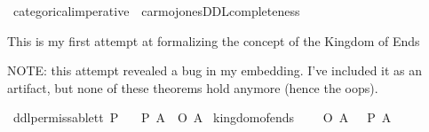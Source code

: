 %
\begin{isabellebody}%
%
%
\isadelimtheory
%
\endisadelimtheory
%
\isatagtheory
{}\isamarkupfalse%
\ categorical{\isacharunderscore}imperative{\isacharunderscore}{}\ \ carmojones{\isacharunderscore}DDL{\isacharunderscore}completeness\isanewline
\isanewline
{}%
\endisatagtheory
{\isafoldtheory}%
%
\isadelimtheory
%
\endisadelimtheory
%
\isadelimdocument
%
\endisadelimdocument
%
\isatagdocument
%
\isamarkuptrue%
%
\isamarkuptrue%
%
\endisatagdocument
{\isafolddocument}%
%
\isadelimdocument
%
\endisadelimdocument
%
\begin{isamarkuptext}%
This is my first attempt at formalizing the concept of the Kingdom of Ends%
\end{isamarkuptext}\isamarkuptrue%
%
\begin{isamarkuptext}%
NOTE: this attempt revealed a bug in my embedding. I've included it as an artifact, but none of these theorems hold anymore (hence the oops).%
\end{isamarkuptext}\isamarkuptrue%
\isamarkupfalse%
\ ddlpermissable{\isacharcolon}{\isacharcolon}{\isachardoublequoteopen}t{\isasymRightarrow}t{\isachardoublequoteclose}\ {\isacharparenleft}{\isachardoublequoteopen}P{\isacharunderscore}{\isachardoublequoteclose}{\isacharparenright}\isanewline
\ \ \ {\isachardoublequoteopen}{\isacharparenleft}P\ A{\isacharparenright}\ {\isasymequiv}\ {\isacharparenleft}\isactrlbold {\isasymnot}{\isacharparenleft}O\ {\isacharbraceleft}\isactrlbold {\isasymnot}A{\isacharbraceright}{\isacharparenright}{\isacharparenright}{\isachardoublequoteclose}\isanewline
%
\isanewline
%
\isanewline
%
\isanewline
%
\isanewline
\isanewline
\isanewline
{}\isamarkupfalse%
\ kingdom{\isacharunderscore}of{\isacharunderscore}ends{\isacharunderscore}{}{\isacharcolon}\isanewline
\ \ \ {\isachardoublequoteopen}{\isasymTurnstile}\ {\isacharparenleft}{\isacharparenleft}O\ {\isacharbraceleft}A{\isacharbraceright}{\isacharparenright}\ \isactrlbold {\isasymrightarrow}\ {\isacharparenleft}{\isasymbox}\ {\isacharparenleft}P\ A{\isacharparenright}{\isacharparenright}{\isacharparenright}{\isachardoublequoteclose}\isanewline

\end{isabellebody}
